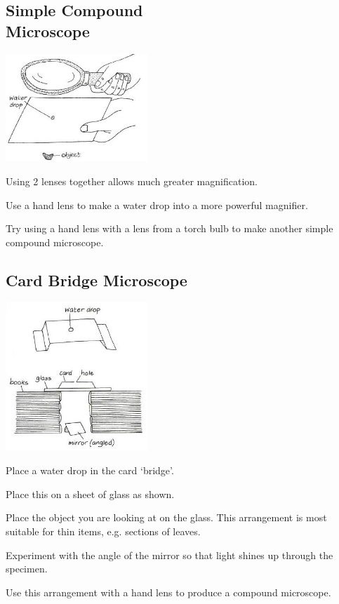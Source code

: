 \begin{multicols}{2}
\vfill
\columnbreak

\subsection{Simple Compound \hfill \\ Microscope}
\begin{center}
\includegraphics[width=0.4\textwidth]{./img/vso/compound-microscope.jpg}
\end{center}

\begin{itemize*}
\item Using 2 lenses together allows much greater magnification. 
\item Use a hand lens to make a water drop into a more powerful magnifier. 
\item Try using a hand lens with a lens from a torch bulb to make another simple compound microscope.
\end{itemize*}


\subsection{Card Bridge Microscope}
\begin{center}
\includegraphics[width=0.4\textwidth]{./img/vso/card-microscope.jpg}
\end{center}

\begin{itemize*}
\item Place a water drop in the card `bridge'. 
\item Place this on a sheet of glass as shown. 
\item Place the object you are looking
at on the glass. This
arrangement is most suitable
for thin items, e.g. sections of leaves. 
\item Experiment with the angle of
the mirror so that light shines
up through the specimen.
\item Use this arrangement with a
hand lens to produce a
compound microscope.
\end{itemize*}

\vfill

\end{multicols}